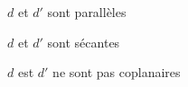 \documentclass{cornouaille}
\begin{document}
\begin{QCM}
\begin{GroupeQCM}
  \begin{exercice}
    \begin{ChoixQCM}{3}
    \item $d$ et $d'$ sont parallèles
    \item  $d$ et $d'$ sont sécantes 
    \item  $d$ est $d'$ ne sont pas coplanaires 
    \end{ChoixQCM}
  \end{exercice}
\begin{solution}
\end{solution}
\end{GroupeQCM}
\end{QCM}
\end{document}
